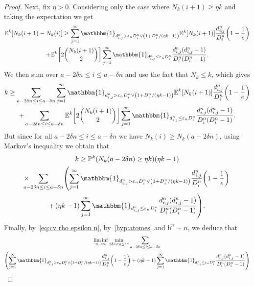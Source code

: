 \documentclass[AHL,Unicode,published]{cedram}
\newcommand{\e}{\varepsilon}
\renewcommand{\P}{{\mathbb{P}}}
\newcommand{\E}{\mathbb{E}}
\newcommand{\1}{\mathbbm{1}}
\newcommand{\h}{\mathsf{h}}
\let\originalleft\left
\let\originalright\right
\renewcommand{\left}{\mathopen{}\mathclose\bgroup\originalleft}
\renewcommand{\right}{\aftergroup\egroup\originalright}
\renewcommand*{\to}{\mathchoice{\longrightarrow}{\rightarrow}{\rightarrow}{\rightarrow}}
\begin{document}
\begin{proof}
Next, fix $\eta>0$. Considering only the case where $N_k(i+1)\ge \eta k$ and taking the expectation we get
\begin{multline*}
\E^k \left[N_k(i+1) - N_k(i) \right]
\ge \sum_{j=1}^\infty \1_{d^n_{i,j}>\e_n D^n_i \vee \left(1+ D^n_i/(\eta k-1)\right)} \E^k[N_k(i+1)] \frac{d^n_{i,j}}{D^n_i} \left(1-\frac{1}{e}\right)
\\+ \E^k\left[2\binom{N_k(i+1)}{2}\right] \sum_{j=1}^\infty \1_{d^n_{i,j} \le \e_n D^n_i} \frac{d^n_{i,j} (d^n_{i,j} -1)}{D^n_i(D^n_i-1)}.
\end{multline*}
We then sum over $a-2\delta n \le i \le a - \delta n$ and use the fact that $N_k \le k$, which gives
\begin{multline*}
k\ge \sum_{a-2 \delta n \le i \le a-\delta n}\sum_{j=1}^\infty \1_{d^n_{i,j}>\e_n D^n_i \vee \left(1+ D^n_i/(\eta k-1)\right)} \E^k[N_k(i+1)] \frac{d^n_{i,j}}{D^n_i} \left(1-\frac{1}{e}\right) \\
+ \sum_{a-2 \delta n \le i \le a-\delta n}\E^k\left[2\binom{N_k(i+1)}{2}\right] \sum_{j=1}^\infty \1_{d^n_{i,j} \le \e_n D^n_i} \frac{d^n_{i,j} (d^n_{i,j} -1)}{D^n_i(D^n_i-1)}.
\end{multline*}
But since for all $a-2 \delta n \le i \le a- \delta n$ we have $N_k(i) \ge N_k(a-2\delta n)$, using Markov's inequality we obtain that
\begin{multline}\label{eq majoration nombre de gens qui ne coalescent pas}
k\ge \P^k(N_k(a- 2 \delta n)\ge \eta k) (\eta k-1)\\
\times\!\!\!\!\!\!\sum_{a-2 \delta n \le i \le a-\delta n} \left(\sum_{j=1}^\infty \1_{d^n_{i,j}>\e_n D^n_i \vee \left(1+ D^n_i/(\eta k-1)\right)} \frac{d^n_{i,j}}{D^n_i} \left(1-\frac{1}{e}\right)\right.\\
 +\left. (\eta k-1)\sum_{j=1}^\infty \1_{d^n_{i,j} \le \e_n D^n_i} \frac{d^n_{i,j} (d^n_{i,j} -1)}{D^n_i(D^n_i-1)} \right).
\end{multline}
Finally, by~\eqref{eq:cv rho epsilon n}, by~\ref{hyp:atomes} and $\h^n\sim n$, we deduce that
\begin{multline*}
\liminf_{n\to \infty} \min_{2 \delta n < a \le \h^n}
\sum_{a-2 \delta n \le i \le a-\delta n}\\
\left(\sum_{j=1}^\infty \1_{d^n_{i,j}>\e_n D^n_i \vee \left(1+ D^n_i/(\eta k-1)\right)} \frac{d^n_{i,j}}{D^n_i} \left(1-\frac{1}{e}\right)
+ (\eta k-1)\sum_{j=1}^\infty \1_{d^n_{i,j} \le \e_n D^n_i} \frac{d^n_{i,j} (d^n_{i,j} -1)}{D^n_i(D^n_i-1)} \right)\\

\end{multline*}
\end{proof}
\end{document}
